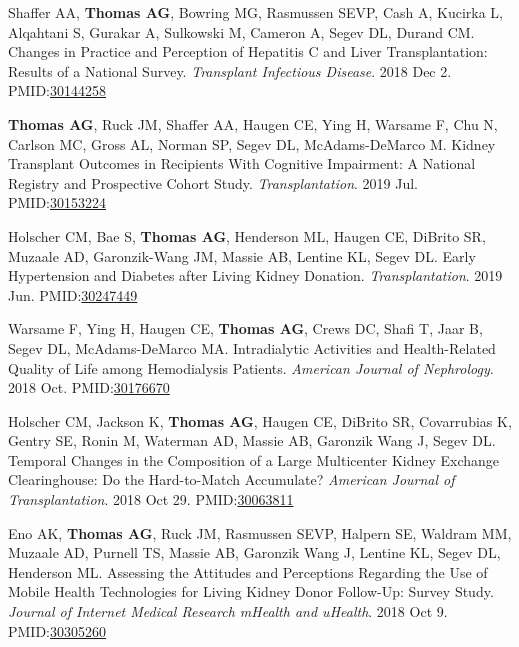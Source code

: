 \documentclass[10pt]{article}
\makeatletter
\newlength{\bibhang}
\newlength{\bibsep}
 {\@listi \global\bibsep\itemsep \global\advance\bibsep by\parsep}
\newenvironment{bibenum*}
  {\renewcommand\labelenumi{[\theenumi]}%
   \etaremune[
     topsep=0pt,
     itemsep=\bibsep,
     parsep=0pt,partopsep=0pt,
     itemindent=-\bibhang,
     leftmargin={\bibhang+\widthof{[999]}}]}
  {\endetaremune}
\newcommand{\pmid}[1]{PMID:\href{https://www.ncbi.nlm.nih.gov/pubmed/#1}{#1}}
\makeatother
\begin{document}
\begin{bibenum*}
\item Shaffer AA, \textbf{Thomas AG}, Bowring MG, Rasmussen SEVP,
  Cash A, Kucirka L, Alqahtani S, Gurakar A, Sulkowski M, Cameron A,
  Segev DL, Durand CM. Changes in Practice and Perception of Hepatitis
  C and Liver Transplantation: Results of a National Survey.
  \emph{Transplant Infectious Disease}. 2018 Dec 2.
  \pmid{30144258} 

\item \textbf{Thomas AG\dag}, Ruck JM\dag, Shaffer AA, Haugen CE, Ying H,
  Warsame F, Chu N, Carlson MC, Gross AL,
  Norman SP, Segev DL, McAdams-DeMarco M.
  Kidney Transplant Outcomes in Recipients With Cognitive Impairment: 
  A National Registry and Prospective Cohort Study.
  \emph{Transplantation}. 2019 Jul.
  \pmid{30153224} 

\item Holscher CM, Bae S, \textbf{Thomas AG}, Henderson ML, Haugen CE,
  DiBrito SR, Muzaale AD, Garonzik-Wang JM, Massie AB, Lentine KL, Segev DL.
  Early Hypertension and Diabetes after Living Kidney Donation.
  \emph{Transplantation}. 2019 Jun.
  \pmid{30247449} 

\item Warsame F, Ying H, Haugen CE, \textbf{Thomas AG}, Crews DC, Shafi T,
  Jaar B, Segev DL, McAdams-DeMarco MA. Intradialytic Activities and
  Health-Related Quality of Life among Hemodialysis Patients.
  \emph{American Journal of Nephrology}. 2018 Oct.
  \pmid{30176670} 

\item Holscher CM, Jackson K, \textbf{Thomas AG}, Haugen CE, DiBrito SR,
  Covarrubias K, Gentry SE, Ronin M, Waterman AD, Massie AB,
  Garonzik Wang J, Segev DL.
  Temporal Changes in the Composition of a Large Multicenter Kidney
  Exchange Clearinghouse: Do the Hard-to-Match Accumulate?
  \emph{American Journal of Transplantation}. 2018 Oct 29.
  \pmid{30063811} 

\item Eno AK, \textbf{Thomas AG}, Ruck JM, Rasmussen SEVP,
  Halpern SE, Waldram MM, Muzaale AD, Purnell TS, Massie AB,
  Garonzik Wang J, Lentine KL, Segev DL, Henderson ML.
  Assessing the Attitudes and Perceptions Regarding the Use of Mobile Health 
  Technologies for Living Kidney Donor Follow-Up: Survey Study.
  \emph{Journal of Internet Medical Research mHealth and uHealth}.
  2018 Oct 9.
  \pmid{30305260} 


\end{bibenum*}
\end{document}
